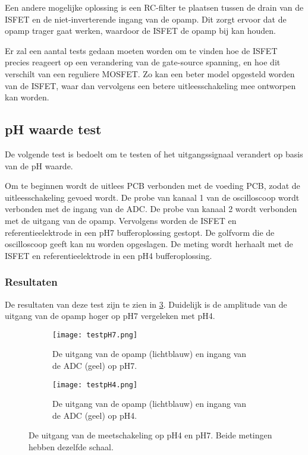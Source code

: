 Een andere mogelijke oplossing is een RC-filter te plaatsen tussen de drain van de ISFET en de niet-inverterende ingang van de opamp. Dit zorgt ervoor dat de opamp trager gaat werken, waardoor de ISFET de opamp bij kan houden.

Er zal een aantal tests gedaan moeten worden om te vinden hoe de ISFET precies reageert op een verandering van de gate-source spanning, en hoe dit verschilt van een reguliere MOSFET. Zo kan een beter model opgesteld worden van de ISFET, waar dan vervolgens een betere uitleesschakeling mee ontworpen kan worden.


\subsection{pH waarde test} 
De volgende test is bedoelt om te testen of het uitgangssignaal verandert op basis van de pH waarde. 

Om te beginnen wordt de uitlees PCB verbonden met de voeding PCB, zodat de uitleesschakeling gevoed wordt. De probe van kanaal 1 van de oscilloscoop wordt verbonden met de ingang van de ADC. De probe van kanaal 2 wordt verbonden met de uitgang van de opamp. Vervolgens worden de ISFET en referentieelektrode in een pH7 bufferoplossing gestopt. De golfvorm die de oscilloscoop geeft kan nu worden opgeslagen. De meting wordt herhaalt met de ISFET en referentieelektrode in een pH4 bufferoplossing.

\subsubsection{Resultaten}
De resultaten van deze test zijn te zien in \cref{fig:resultspHMeasure}. Duidelijk is de amplitude van de uitgang van de opamp hoger op pH7 vergeleken met pH4.

\begin{figure}[ht]
    \centering
    \begin{subfigure}[b]{0.475\textwidth}
        \centering
        \def\svgwidth{\textwidth}
        \texttt{[image: testpH7.png]}
        \caption{De uitgang van de opamp (lichtblauw) en ingang van de ADC (geel) op pH7.}
        \label{fig:resultpH7}
    \end{subfigure}
    \hfill
    \begin{subfigure}[b]{0.475\textwidth}
        \centering
        \def\svgwidth{\textwidth}
        \texttt{[image: testpH4.png]}
        \caption{De uitgang van de opamp (lichtblauw) en ingang van de ADC (geel) op pH4.}
        \label{fig:resultpH4}
    \end{subfigure}
    \caption{De uitgang van de meetschakeling op pH4 en pH7. Beide metingen hebben dezelfde schaal.}
    \label{fig:resultspHMeasure}
\end{figure}

